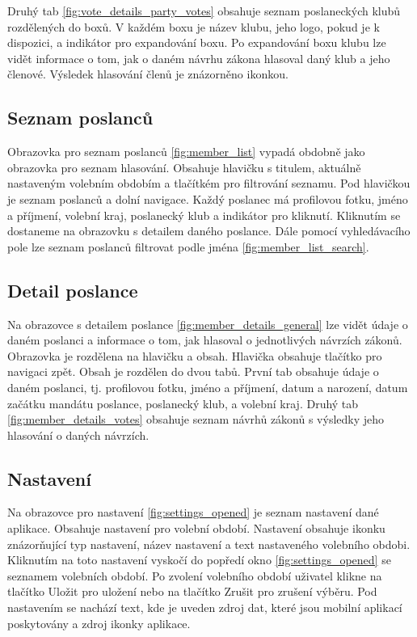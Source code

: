 Druhý tab \ref{fig:vote_details_party_votes} obsahuje seznam poslaneckých klubů rozdělených do boxů. V každém boxu je název klubu, jeho logo, pokud je k dispozici, a indikátor pro expandování boxu. Po expandování boxu klubu lze vidět informace o tom, jak o daném návrhu zákona hlasoval daný klub a jeho členové. Výsledek hlasování členů je znázorněno ikonkou.

\subsection*{Seznam poslanců}
\label{ssec:design-members}

Obrazovka pro seznam poslanců \ref{fig:member_list} vypadá obdobně jako obrazovka pro seznam hlasování. Obsahuje hlavičku s titulem, aktuálně nastaveným volebním obdobím a tlačítkém pro filtrování seznamu. Pod hlavičkou je seznam poslanců a dolní navigace. Každý poslanec má profilovou \linebreak fotku, jméno a příjmení, volební kraj, poslanecký klub a indikátor pro kliknutí. Kliknutím se dostaneme na obrazovku s detailem daného poslance. Dále pomocí vyhledávacího pole lze seznam poslanců filtrovat podle jména \ref{fig:member_list_search}.

\subsection*{Detail poslance}
\label{ssec:design-member}

Na obrazovce s detailem poslance \ref{fig:member_details_general} lze vidět údaje o daném poslanci a informace \linebreak o tom, jak hlasoval o jednotlivých návrzích zákonů. Obrazovka je rozdělena na hlavičku a obsah. Hlavička obsahuje tlačítko pro navigaci zpět. Obsah je rozdělen do dvou tabů. První tab obsahuje údaje o daném poslanci, tj. profilovou fotku, jméno a příjmení, datum a narození, datum začátku mandátu poslance, poslanecký klub, a volební kraj. Druhý tab \ref{fig:member_details_votes} obsahuje seznam návrhů zákonů s výsledky jeho hlasování o daných návrzích. 

\subsection*{Nastavení}
\label{ssec:design-settings}
	
Na obrazovce pro nastavení \ref{fig:settings_opened} je seznam nastavení dané aplikace. Obsahuje nastavení pro volební období. Nastavení obsahuje ikonku znázorňující typ nastavení, název nastavení a text nastaveného volebního obdobi. Kliknutím na toto nastavení vyskočí do popředí okno \ref{fig:settings_opened} se seznamem volebních období. Po zvolení volebního období uživatel klikne na tlačítko Uložit pro uložení nebo na tlačítko Zrušit pro zrušení výběru. Pod nastavením se nachází text, kde je uveden zdroj dat, které jsou mobilní aplikací poskytovány a zdroj ikonky aplikace.

